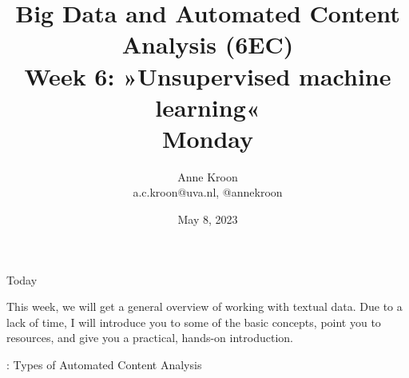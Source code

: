 

\graphicspath{{../../resources/img/}}




\title[Big Data and Automated Content Analysis]{\textbf{Big Data and Automated Content Analysis (6EC)} 
\\Week 6: »Unsupervised machine learning«
\\Monday}
\author[Anne Kroon]{Anne Kroon\\ \footnotesize{a.c.kroon@uva.nl, @annekroon \\}}
\date{May 8, 2023}


\begin{frame}{}
	\titlepage
\end{frame}

\begin{frame}{Today}
	\tableofcontents
\end{frame}


\begin{frame}[standout]
This week, we will get a general overview of working with textual data. Due to a lack of time, I will introduce you to some of the basic concepts, point you to resources, and give you a practical, hands-on introduction. 
\end{frame}

\begin{frame}{\cite{Boumans2016}: Types of Automated Content Analysis}
\end{frame}

